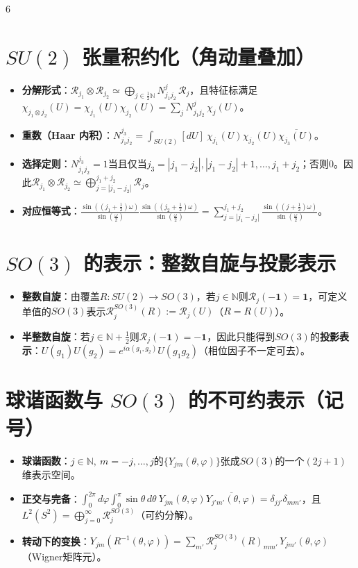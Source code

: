 \documentclass[landscape]{article}
\begin{document}
\begin{multicols*}{6}
\section*{$SU(2)$ 张量积约化（角动量叠加）}
\begin{itemize}
  \item \textbf{分解形式}：$\mathcal R_{j_1}\otimes \mathcal R_{j_2}\simeq \bigoplus_{j\in\frac12\mathbb{N}} N_{j_1j_2}^{j}\,\mathcal R_j$，且特征标满足$\chi_{j_1\otimes j_2}(U)=\chi_{j_1}(U)\chi_{j_2}(U)=\sum_j N_{j_1j_2}^j\,\chi_j(U)$。
  \item \textbf{重数（Haar 内积）}：$N_{j_1j_2}^{j_3}=\int_{SU(2)}[dU]\ \chi_{j_1}(U)\chi_{j_2}(U)\overline{\chi_{j_3}(U)}$。
  \item \textbf{选择定则}：$N_{j_1j_2}^{j_3}=1$当且仅当$j_3=|j_1-j_2|,|j_1-j_2|+1,\dots,j_1+j_2$；否则$0$。因此$\mathcal R_{j_1}\otimes\mathcal R_{j_2}\simeq\bigoplus_{j=|j_1-j_2|}^{j_1+j_2}\mathcal R_j$。
  \item \textbf{对应恒等式}：$\frac{\sin((j_1+\tfrac12)\omega)}{\sin(\tfrac{\omega}{2})}\frac{\sin((j_2+\tfrac12)\omega)}{\sin(\tfrac{\omega}{2})}=\sum_{j=|j_1-j_2|}^{j_1+j_2}\frac{\sin((j+\tfrac12)\omega)}{\sin(\tfrac{\omega}{2})}$。
\end{itemize}

\section*{$SO(3)$ 的表示：整数自旋与投影表示}
\begin{itemize}
  \item \textbf{整数自旋}：由覆盖$R:SU(2)\to SO(3)$，若$j\in\mathbb{N}$则$\mathcal R_j(-\mathbf{1})=\mathbf{1}$，可定义单值的$SO(3)$表示$\mathcal R^{SO(3)}_j(R):=\mathcal R_j(U)$（$R=R(U)$）。
  \item \textbf{半整数自旋}：若$j\in\mathbb{N}+\tfrac12$则$\mathcal R_j(-\mathbf{1})=-\mathbf{1}$，因此只能得到$SO(3)$的\textbf{投影表示}：$U(g_1)U(g_2)=e^{i\alpha(g_1,g_2)}U(g_1g_2)$（相位因子不一定可去）。
\end{itemize}

\section*{球谐函数与 $SO(3)$ 的不可约表示（记号）}
\begin{itemize}
  \item \textbf{球谐函数}：$j\in\mathbb{N},\ m=-j,\dots,j$的$\{Y_{jm}(\theta,\varphi)\}$张成$SO(3)$的一个$(2j+1)$维表示空间。
  \item \textbf{正交与完备}：$\int_0^{2\pi}\!d\varphi\int_0^\pi\!\sin\theta\,d\theta\ Y_{jm}(\theta,\varphi)\overline{Y_{j'm'}(\theta,\varphi)}=\delta_{jj'}\delta_{mm'}$，且$L^2(S^2)=\bigoplus_{j=0}^{\infty}\mathcal R^{SO(3)}_j$（可约分解）。
  \item \textbf{转动下的变换}：$Y_{jm}(R^{-1}(\theta,\varphi))=\sum_{m'} \mathcal R^{SO(3)}_j(R)_{mm'}\,Y_{jm'}(\theta,\varphi)$（Wigner矩阵元）。
\end{itemize}


\end{multicols*}
\end{document}
